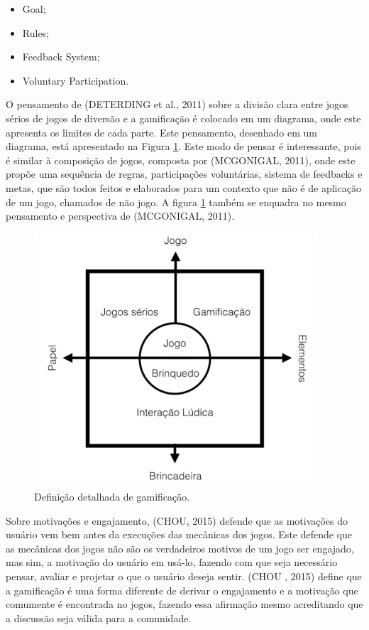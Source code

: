 \begin{itemize}
    \item Goal;
    \item Rules;
    \item Feedback System;
    \item Voluntary Participation.
\end{itemize}

O pensamento de (DETERDING et al., 2011) sobre a divisão clara entre jogos sérios
de jogos de diversão e a gamificação é colocado em um diagrama, onde este
apresenta os limites de cada parte. Este pensamento, desenhado em um diagrama,
está apresentado na Figura \ref{fig:gamificacaodetalhada}. Este modo de pensar é interessante, pois
é similar à composição de jogos, composta por (MCGONIGAL, 2011), onde este
propõe uma sequência de regras, participações voluntárias, sistema de
feedbacks e metas, que são todos feitos e elaborados para um contexto que
não é de aplicação de um jogo, chamados de não jogo. A figura \ref{fig:gamificacaodetalhada}
também se enquadra no mesmo pensamento e perspectiva de (MCGONIGAL, 2011).

\begin{figure}[h]
    \centering
    \includegraphics[width=400px, scale=1]{figuras/gamificacaodetalhada}
    \caption{Definição detalhada de gamificação. }
    \label{fig:gamificacaodetalhada}
\end{figure}


Sobre motivações e engajamento, (CHOU, 2015) defende que as motivações
do usuário vem bem antes da execuções das mecânicas dos jogos. Este defende
que as mecânicas dos jogos não são os verdadeiros motivos de um jogo ser
engajado, mas sim, a motivação do usuário em usá-lo, fazendo com que seja
necessário pensar, avaliar e projetar o que o usuário deseja sentir. (CHOU
, 2015) define que a gamificação é uma forma diferente de derivar o engajamento
e a motivação  que comumente é encontrada no jogos, fazendo essa afirmação
mesmo acreditando que a discussão seja válida para a comunidade.

